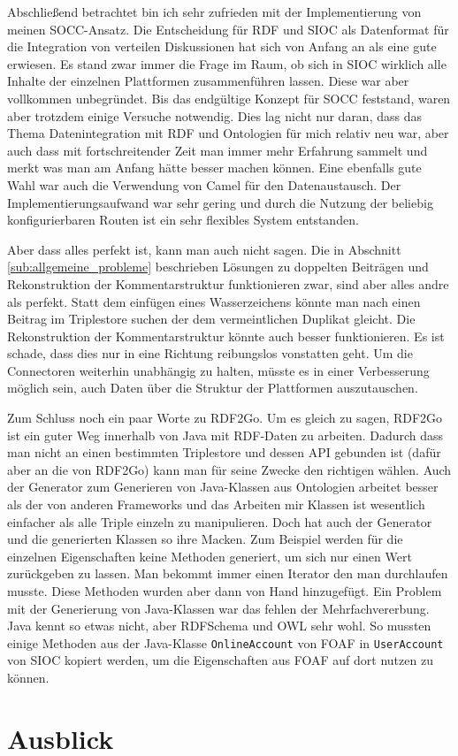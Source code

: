 Abschließend betrachtet bin ich sehr zufrieden mit der Implementierung von meinen SOCC-Ansatz. Die Entscheidung für RDF und SIOC als Datenformat für die Integration von verteilen Diskussionen hat sich von Anfang an als eine gute erwiesen. Es stand zwar immer die Frage im Raum, ob sich in SIOC wirklich alle Inhalte der einzelnen Plattformen zusammenführen lassen. Diese war aber vollkommen unbegründet. Bis das endgültige Konzept für SOCC feststand, waren aber trotzdem einige Versuche notwendig. Dies lag nicht nur daran, dass das Thema Datenintegration mit RDF und Ontologien für mich relativ neu war, aber auch dass mit fortschreitender Zeit man immer mehr Erfahrung sammelt und merkt was man am Anfang hätte besser machen können. Eine ebenfalls gute Wahl war auch die Verwendung von Camel für den Datenaustausch. Der Implementierungsaufwand war sehr gering und durch die Nutzung der beliebig konfigurierbaren Routen ist ein sehr flexibles System entstanden. 

Aber dass alles perfekt ist, kann man auch nicht sagen. Die in Abschnitt \ref{sub:allgemeine_probleme} beschrieben Lösungen zu doppelten Beiträgen und Rekonstruktion der Kommentarstruktur funktionieren zwar, sind aber alles andre als perfekt. Statt dem einfügen eines Wasserzeichens könnte man nach einen Beitrag im Triplestore suchen der dem vermeintlichen Duplikat gleicht. Die Rekonstruktion der Kommentarstruktur könnte auch besser funktionieren. Es ist schade, dass dies nur in eine Richtung reibungslos vonstatten geht. Um die Connectoren weiterhin unabhängig zu halten, müsste es in einer Verbesserung möglich sein, auch Daten über die Struktur der Plattformen auszutauschen. 

Zum Schluss noch ein paar Worte zu RDF2Go. Um es gleich zu sagen, RDF2Go ist ein guter Weg innerhalb von Java mit RDF-Daten zu arbeiten. Dadurch dass man nicht an einen bestimmten Triplestore und dessen API gebunden ist (dafür aber an die von RDF2Go) kann man für seine Zwecke den richtigen wählen. Auch der Generator zum Generieren von Java-Klassen aus Ontologien arbeitet besser als der von anderen Frameworks und das Arbeiten mir Klassen ist wesentlich einfacher als alle Triple einzeln zu manipulieren. Doch hat auch der Generator und die generierten Klassen so ihre Macken. Zum Beispiel werden für die einzelnen Eigenschaften keine Methoden generiert, um sich nur einen Wert zurückgeben zu lassen. Man bekommt immer einen Iterator den man durchlaufen musste. Diese Methoden wurden aber dann von Hand hinzugefügt. Ein Problem mit der Generierung von Java-Klassen war das fehlen der Mehrfachvererbung. Java kennt so etwas nicht, aber RDFSchema und OWL sehr wohl. So mussten einige Methoden aus der Java-Klasse \texttt{OnlineAccount} von FOAF in \texttt{UserAccount} von SIOC kopiert werden, um die Eigenschaften aus FOAF auf dort nutzen zu können.


\section{Ausblick} %
\label{sec:ausblick}





